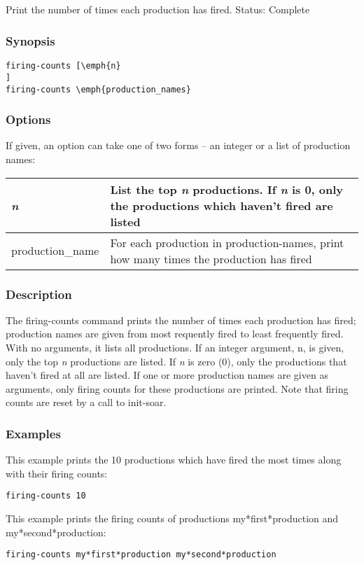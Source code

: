 \subsection{}
\label{firing-counts}
Print the number of times each production has fired. 
 Status: Complete
\subsubsection*{Synopsis}
\begin{verbatim}
firing-counts [\emph{n}
]
firing-counts \emph{production_names}
\end{verbatim}
\subsubsection*{Options}
 If given, an option can take one of two forms -- an integer or a list of production names: 
\begin{tabular}{|l|l|}
\hline 
\emph{n}
 & List the top \emph{n}
 productions. If \emph{n}
 is 0, only the productions which haven't fired are listed  \\
 \hline 
 production\_name  & For each production in production-names, print how many times the production has fired  \\
 \hline 
\end{tabular}
\subsubsection*{Description}
 The firing-counts command prints the number of times each production has fired; production names are given from most requently fired to least frequently fired. With no arguments, it lists all productions. If an integer argument, n, is given, only the top \emph{n}
 productions are listed. If \emph{n}
 is zero (0), only the productions that haven't fired at all are listed. If one or more production names are given as arguments, only firing counts for these productions are printed. 
 Note that firing counts are reset by a call to init-soar. 
\subsubsection*{Examples}
 This example prints the 10 productions which have fired the most times along with their firing counts: \begin{verbatim}
firing-counts 10
\end{verbatim}
 This example prints the firing counts of productions my*first*production and my*second*production: \begin{verbatim}
firing-counts my*first*production my*second*production
\end{verbatim}
